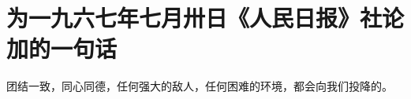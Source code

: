 \section[为一九六七年七月卅日《人民日报》社论加的一句话（一九六七年七月）]{为一九六七年七月卅日《人民日报》社论加的一句话}


团结一致，同心同德，任何强大的敌人，任何困难的环境，都会向我们投降的。


